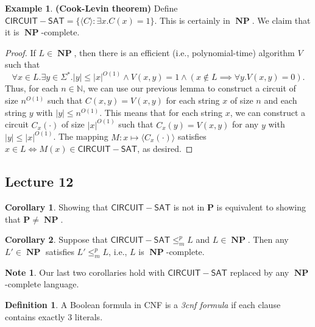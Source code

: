 \documentclass[10pt,letterpaper,cm]{nupset}
\theoremstyle{definition}
\newtheorem*{definition}{Definition}
\newtheorem{exmp}{Example}
\newtheorem{note}{Note}
\newtheorem{corollary}{Corollary}
\newcommand{\N}{\mathbb N}
\newcommand{\1}{\mathbf{1}}
\newcommand{\0}{\vec 0}
\DeclareMathOperator{\NP}{\mathbf{NP}}
\begin{document}
\begin{exmp}{\textbf{(Cook-Levin theorem)}}
Define $\mathsf{CIRCUIT{-}SAT} = \{ \langle C \rangle : \exists x. C(x) = 1\}$. This is certainly in $\NP$. We claim that it is $\NP$-complete.
\end{exmp}
\begin{proof}
If $L \in \NP$, then there is an efficient (i.e.,  polynomial-time) algorithm $V$ such that $$\forall x\in L.\exists y\in \Sigma^{\ast}.|y|\leq |x|^{O(1)} \land V(x,y) =1 \land (x\notin L \implies \forall y. V(x,y)=0).$$ Thus, for each $n\in \N$, we can use our previous lemma to construct a circuit of size $n^{O(1)}$ such that $C(x,y) = V(x,y)$ for each string $x$ of size $n$ and each string $y$ with $|y|\leq n^{O(1)}$. This means that for each string $x$, we can construct a circuit $C_x(\cdot)$ of size $|x|^{O(1)}$ such that $C_x(y) = V(x,y)$ for any $y$ with $|y|\leq |x|^{O(1)}$. The mapping $M: x\mapsto \langle C_x(\cdot) \rangle$ satisfies $x\in L \iff M(x) \in \mathsf{CIRCUIT{-}SAT}$, as desired.  
\end{proof}

\subsection{Lecture 12}

\begin{corollary}
Showing that $\mathsf{CIRCUIT{-}SAT}$ is not in $\mathbf{P}$ is equivalent to showing that $\mathbf{P} \ne \NP$.
\end{corollary}

\begin{corollary}
Suppose that $\mathsf{CIRCUIT{-}SAT} \leq_m^p L$ and $L\in \NP$. Then any $L' \in \NP$ satisfies $L' \leq_m^p L$, i.e., $L$ is $\NP$-complete.
\end{corollary}

\begin{note}
Our last two corollaries hold with $\mathsf{CIRCUIT{-}SAT}$ replaced by any $\NP$-complete language. 
\end{note}

\begin{definition}
A Boolean formula in CNF is a \textit{3cnf formula} if each clause contains exactly $3$ literals.  
\end{definition}
\end{document}
